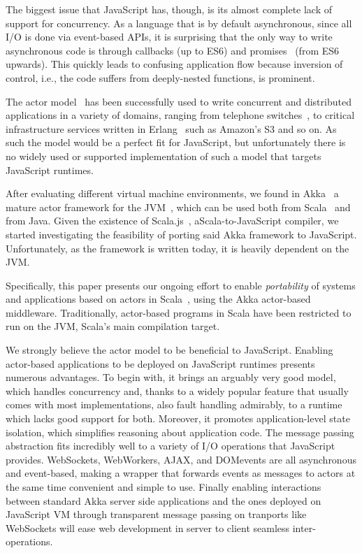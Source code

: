 \documentclass{sig-alternate}
\begin{document}
The biggest issue that JavaScript has, though, is its almost complete lack of support for concurrency. As a language that is by default asynchronous, since all I/O is done via event-based APIs, it is surprising that the only way to write asynchronous code is through callbacks (up to ES6) and promises~\cite{LiskovS88} (from ES6 upwards). This quickly leads to confusing application flow because inversion of control, i.e., the code suffers from deeply-nested functions, is prominent.

The actor model~\cite{Hewitt77,Agha} has been successfully used to write concurrent and distributed applications in a variety of domains, ranging from telephone switches~\cite{ErlangApplications}, to critical infrastructure services written in Erlang~\cite{Armstrong10} such as Amazon's S3 and so on. As such the model would be a perfect fit for JavaScript, but unfortunately there is no widely used or supported implementation of such a model that targets JavaScript runtimes.

After evaluating different virtual machine environments, we found in Akka~\cite{Akka} a mature actor framework for the JVM~\cite{Lindholm-Yellin}, which can be used both from Scala~\cite{OderskyR14} and from Java. Given the existence of Scala.js~\cite{Scalajs}, a\newline Scala-to-JavaScript compiler, we started investigating the feasibility of porting said Akka framework to JavaScript. Unfortunately, as the framework is written today, it is heavily dependent on the JVM.

Specifically, this paper presents our ongoing effort to enable {\em portability} of systems and applications based on actors in Scala~\cite{ActorsInScala}, using the Akka actor-based middleware. Traditionally, actor-based programs in Scala have been restricted to run on the JVM, Scala's main compilation target.

We strongly believe the actor model to be beneficial to JavaScript. Enabling actor-based applications to be deployed on JavaScript runtimes presents numerous advantages. To begin with, it brings an arguably very good model, which handles concurrency and, thanks to a widely popular feature that usually comes with most implementations, also fault handling admirably, to a runtime which lacks good support for both. Moreover, it promotes application-level state isolation, which simplifies reasoning about application code. The message passing abstraction fits incredibly well to a variety of I/O operations that JavaScript provides. WebSockets, WebWorkers, AJAX, and DOM\newline events are all asynchronous and event-based, making a wrapper that forwards events as messages to actors at the same time convenient and simple to use. Finally enabling interactions between standard Akka server side applications and the ones deployed on JavaScript VM through transparent message passing on tranports like WebSockets will ease web development in server to client seamless inter-operations.
\end{document}
